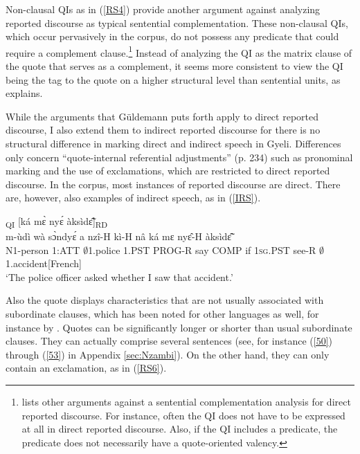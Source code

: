 Non-clausal QIs as in (\ref{RS4}) provide another argument against analyzing reported discourse as typical sentential complementation. These non-clausal QIs, which occur pervasively in the corpus, do not possess any predicate that could require a complement clause.\footnote{\citet[226-233]{guldemann2008} lists other arguments against a sentential complementation analysis for direct reported discourse. For instance, often the QI does not have to be expressed at all in direct reported discourse. Also, if the QI includes a predicate, the predicate does not  necessarily have a quote-oriented valency.} Instead of analyzing the QI as the matrix clause of the quote that serves as a complement, it seems more consistent to view 
 the QI being the tag to the quote on a higher structural level than sentential units, as \citet[231]{guldemann2008} explains. 

While the arguments that Güldemann puts forth apply to direct reported discourse, I also extend them to indirect reported discourse for there is no structural difference in marking direct and indirect speech in Gyeli. Differences only concern ``quote-internal referential adjustments'' (p. 234) such as pronominal marking and the use of exclamations, which are restricted to direct reported discourse. In the corpus, most instances of reported discourse are direct.
There are, however, also examples of indirect speech, as in (\ref{IRS}).

\begin{exe}
\ex\label{IRS}
  \textsubscript{QI} [ká mɛ̀ nyɛ́ àksìdɛ̃̂]\textsubscript{RD}  \\
        m-ùdì wà sɔ̀ndyɛ́ a nzî-H kì-H nâ ká mɛ nyɛ̂-H àksìdɛ̃̂ \\
         N1-person 1:ATT $\emptyset$1.police 1.PST PROG-R say COMP if 1\textsc{sg}.PST see-R $\emptyset$1.accident[French] \\
    \trans `The police officer asked whether I saw that accident.'
\end{exe}

Also the quote displays characteristics that are not usually associated with subordinate clauses, which has been noted for other languages as well, for instance by \citet{spronck2017}. Quotes can be significantly longer or shorter than usual subordinate clauses. They can actually comprise several sentences (see, for instance (\ref{50}) through (\ref{53}) in Appendix \ref{sec:Nzambi}).
On the other hand, they can only contain an exclamation, as in (\ref{RS6}).

